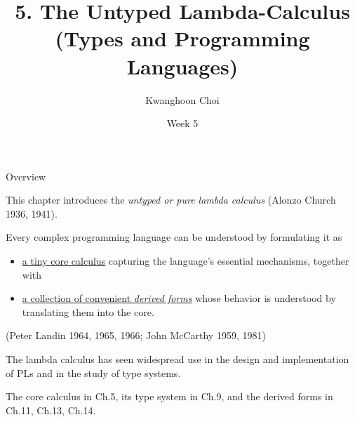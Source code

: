 \documentclass[table]{beamer}
\title[Types and Programming Languages]{5. The Untyped Lambda-Calculus \\
(Types and Programming Languages)}
\author[K. Choi]{Kwanghoon Choi}
\institute[Chonnam National University]{
Software Languages and Systems Laboratory \\
	Chonnam National University}
\date{Week 5}
\begin{document}
\begin{frame}
	\titlepage
	
\end{frame}


\begin{frame}[t]{Overview} \vspace{10pt}

This chapter introduces the {\it untyped or pure lambda calculus} (Alonzo Church 1936, 1941). 

\vspace{10pt}

Every complex programming language can be understood by formulating it as 
\begin{itemize}
\item \underline{a tiny core calculus} capturing the language's essential mechanisms, together with
\item \underline{a collection of convenient {\it derived forms}} whose behavior is understood by translating them into the core. 
\end{itemize}
(Peter Landin 1964, 1965, 1966; John McCarthy 1959, 1981)

\vspace{10pt}

The lambda calculus has seen widespread use in the design and implementation of PLs and in the study of type systems.

\vspace{10pt}

The core calculus in Ch.5, its type system in Ch.9, and the derived forms in Ch.11, Ch.13, Ch.14.

\end{frame}
\end{document}

